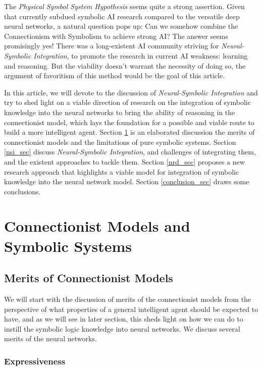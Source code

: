 \documentclass[letterpaper,10pt]{article}
\theoremstyle{definition}
\begin{document}
The \emph{Physical Symbol System Hypothesis} seems quite a strong assertion. Given that currently subdued 
symbolic AI research compared to the versatile deep neural networks, a natural question pops up: 
Can we somehow combine the Connectionism with Symbolism to achieve strong AI?  The answer seems
promisingly yes! There was a long-existent AI community striving for \emph{Neural-Symbolic Integration}\cite{garcez2008neural},
to promote the research in current AI weakness: learning and reasoning. But the viability doesn't warrant
the necessity of doing so, the argument of favoritism of this method would be the goal of this article.
 
In this article, we will devote to the discussion of \emph{Neural-Symbolic Integration} and try to shed light on 
a viable direction of research on the integration of symbolic knowledge into the neural networks to bring
the ability of reasoning in the connectionist model, which lays the foundation for a possible and viable
route to build a more intelligent agent. Section \ref{cm_ss_sec} is an elaborated discussion the merits of connectionist
models and the limitations of pure symbolic systems. Section \ref{nsi_sec} discuss \emph{Neural-Symbolic Integration},
and challenges of integrating them, and the existent approaches to tackle them. Section \ref{nrd_sec} proposes a new research 
approach that highlights a viable model for integration of symbolic knowledge into the neural network model. Section \ref{conclusion_sec}
draws some conclusions.
  
\section{Connectionist Models and Symbolic Systems}\label{cm_ss_sec}

\subsection{Merits of Connectionist Models}\label{nn_merits}

We will start with the discussion of merits of the connectionist models
from the perspective of what properties of a general intelligent agent
should be expected to have, and as we will see in later section, this
sheds light on how we can do to instill the symbolic logic knowledge
into neural networks. We discuss several merits of the neural networks. 

\subsubsection{Expressiveness}
\end{document}

